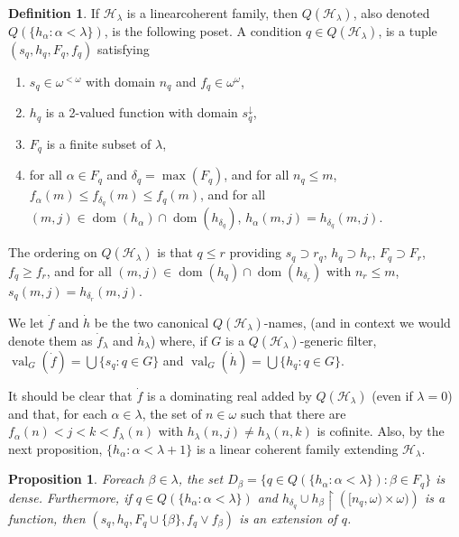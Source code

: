 \documentclass{amsart}
\newtheorem{proposition}[thm]{Proposition}
\theoremstyle{definition}
\newtheorem{definition}[thm]{Definition}
\theoremstyle{remark}
\def\val{\operatorname{val}}
\def\dom{\operatorname{dom}}
\begin{document}
\begin{definition}  If $\mathcal H_\lambda$ is a linear\label{defcoherent} coherent family, 
then $Q(\mathcal H_\lambda)$, also denoted   $Q(\{ h_\alpha : \alpha < \lambda\})$,
is the following poset. A condition $q\in Q(\mathcal H_\lambda)$, is
 a tuple $(s_q, h_q, F_q, f_q)$ satisfying 
 \begin{enumerate}
\item   $s_q\in \omega^{<\omega}$ with domain $n_q$ and $f_q\in \omega^\omega$,
\item $h_q $  is a 2-valued  function with domain  $s_q^\downarrow $,
 \item   $F_q$ is a finite subset of $\lambda$,
 \item for all $\alpha\in F_q$ and $\delta_q = \max(F_q)$,
 and for all $n_q\leq m$,
  $f_\alpha(m)\leq f_{\delta_q}(m) \leq f_q(m)$,
  and for all $(m,j)\in \dom(h_\alpha)\cap \dom(h_{\delta_q})$,
  $h_\alpha(m,j) = h_{\delta_q}(m,j)$.
 \end{enumerate}
 The ordering on $Q(\mathcal H_\lambda)$ is that $q\leq r$
 providing $s_q\supset r_q$, $h_q\supset h_r$, $F_q\supset F_r$,
  $f_q\geq f_r$, and for all $(m,j)\in \dom(h_q)\cap \dom(h_{\delta_r})$
  with $n_r\leq m$, $s_q(m,j) = h_{\delta_r}(m,j)$. 

  We let $\dot f$ and $\dot h$ be the two canonical $Q(\mathcal H_\lambda)$-names,
    (and in context we would  denote them as $\dot f_\lambda$ and $\dot h_\lambda$)
    where, if $G$ is a $Q(\mathcal H_\lambda)$-generic filter,
     $\val_{G}(\dot f) = \bigcup \{ s_q : q\in G\}$
     and $\val_{G}(\dot h) = \bigcup\{ h_q : q\in G\}$. 
\end{definition}

It should be clear that $\dot f$ is a dominating real added by
 $Q(\mathcal H_\lambda)$ (even if $\lambda = 0$)
and that, for each $\alpha\in \lambda$, 
 the set of $n\in\omega$ such that
  there are $f_\alpha(n)< j<k< f_\lambda(n)$
  with $h_\lambda(n,j)\neq h_\lambda(n,k)$ is
  cofinite.
Also, by the next proposition,  
 $\{ h_\alpha : \alpha < \lambda+1\}$
 is a linear coherent family extending $\mathcal H_\lambda$.

\begin{proposition} For\label{density}
each $\beta\in \lambda$,
 the set $D_\beta = \{ q\in Q(\{h_\alpha : \alpha < \lambda\})
 : \beta\in F_q\}$ is dense.  Furthermore, if
  $q\in Q(\{h_\alpha : \alpha<\lambda\})$ and 
  $ h_{\delta_q}\cup 
  h_\beta \restriction \left( [n_q,\omega)\times \omega)\right)
  $ is a function, then $(s_q,h_q, F_q\cup\{\beta\},f_q\vee f_\beta)$ 
  is an extension of $q$. 
\end{proposition}
\end{document}
